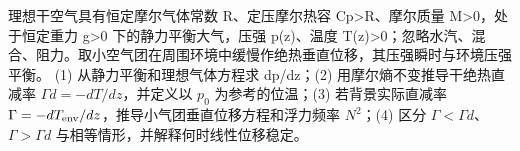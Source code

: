理想干空气具有恒定摩尔气体常数 R、定压摩尔热容 Cp>R、摩尔质量 M>0，处于恒定重力 g>0 下的静力平衡大气，压强 p(z)、温度 T(z)>0；忽略水汽、混合、阻力。取小空气团在周围环境中缓慢作绝热垂直位移，其压强瞬时与环境压强平衡。
(1) 从静力平衡和理想气体方程求 dp/dz；(2) 用摩尔熵不变推导干绝热直减率 \(\Gamma d=-dT/dz\)，并定义以 \(p_{0}\) 为参考的位温；(3) 若背景实际直减率 \(\Gamma=-dT_{\rm env}/dz\)，推导小气团垂直位移方程和浮力频率 \(N^{2}\)；(4) 区分 \(\Gamma <\Gamma d\)、\(\Gamma >\Gamma d\) 与相等情形，并解释何时线性位移稳定。
